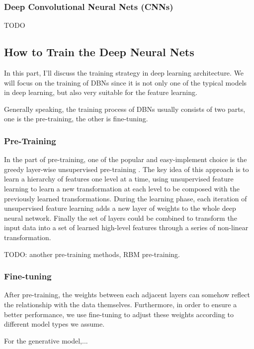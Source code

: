 \documentclass[conference]{IEEEtran}
\begin{document}
\subsubsection{Deep Convolutional Neural Nets (CNNs)}

TODO

\subsection{How to Train the Deep Neural Nets}

In this part, I'll discuss the training strategy in deep learning architecture. We will focus on the training of DBNs since it is not only one of the typical models in deep learning, but also very suitable for the feature learning.

Generally speaking, the training process of DBNs usually consists of two parts, one is the pre-training, the other is fine-tuning.

\subsubsection{Pre-Training}

In the part of pre-training, one of the popular and easy-implement choice is the greedy layer-wise unsupervised pre-training \cite{greedy}. The key idea of this approach is to learn a hierarchy of features one level at a time, using unsupervised feature learning to learn a new transformation at each level to be composed with the previously learned transformations. During the learning phase, each iteration of unsupervised feature learning adds a new layer of weights to the whole deep neural network. Finally the set of layers could be combined to transform the input data into a set of learned high-level features through a series of non-linear transformation.

TODO: another pre-training methods, RBM pre-training.

\subsubsection{Fine-tuning}

After pre-training, the weights between each adjacent layers can somehow reflect the relationship with the data themselves. Furthermore, in order to ensure a better performance, we use fine-tuning to adjust these weights according to different model types we assume.

For the generative model,...
\end{document}
